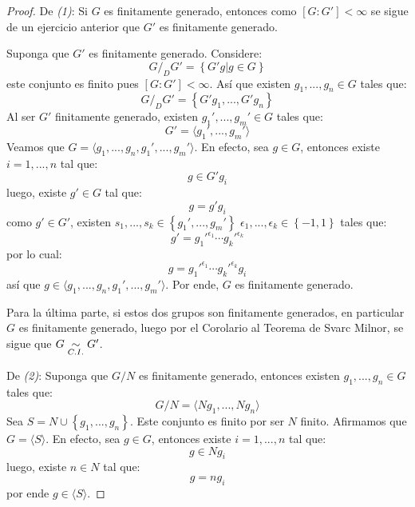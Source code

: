 \documentclass[12pt]{report}
\newcounter{it}
\theoremstyle{largebreak}
\newcommand{\gen}[1]{\ensuremath{\langle#1\rangle}}
\begin{document}
    \begin{proof}
        De \textit{(1)}: Si $G$ es finitamente generado, entonces como $[G:G']<\infty$ se sigue de un ejercicio anterior que $G'$ es finitamente generado.

        Suponga que $G'$ es finitamente generado. Considere:
        \begin{equation*}
            G/_DG'=\left\{G'g\Big|g\in G \right\}
        \end{equation*}
        este conjunto es finito pues $[G:G']<\infty$. Así que existen $g_1,...,g_n\in G$ tales que:
        \begin{equation*}
            G/_DG'=\left\{G'g_1,...,G'g_n \right\}
        \end{equation*}
        Al ser $G'$ finitamente generado, existen $g_1',...,g_m'\in G$ tales que:
        \begin{equation*}
            G'=\gen{g_1',...,g_m'}
        \end{equation*}
        Veamos que $G=\gen{g_1,...,g_n,g_1',...,g_m'}$. En efecto, sea $g\in G$, entonces existe $i=1,...,n$ tal que:
        \begin{equation*}
            g\in G'g_i
        \end{equation*}
        luego, existe $g'\in G$ tal que:
        \begin{equation*}
            g=g'g_i
        \end{equation*}
        como $g'\in G'$, existen $s_1,...,s_k\in\left\{g_1',...,g_m' \right\}$ $\epsilon_1,...,\epsilon_k\in\left\{-1,1\right\}$ tales que:
        \begin{equation*}
            g'=g_1'^{\epsilon_1}\cdots g_k'^{\epsilon_k}
        \end{equation*}
        por lo cual:
        \begin{equation*}
            g=g_1'^{\epsilon_1}\cdots g_k'^{\epsilon_k}g_i
        \end{equation*}
        así que $g\in\gen{g_1,...,g_n,g_1',...,g_m'}$. Por ende, $G$ es finitamente generado.

        Para la última parte, si estos dos grupos son finitamente generados, en particular $G$ es finitamente generado, luego por el Corolario al Teorema de Svarc Milnor, se sigue que $G\underset{C.I.}{\sim} G'$.

        De \textit{(2)}: Suponga que $G/N$ es finitamente generado, entonces existen $g_1,...,g_n\in G$ tales que:
        \begin{equation*}
            G/N=\gen{Ng_1,...,Ng_n}
        \end{equation*}
        Sea $S=N\cup\left\{g_1,...,g_n\right\}$. Este conjunto es finito por ser $N$ finito. Afirmamos que $G=\gen{S}$. En efecto, sea $g\in G$, entonces existe $i=1,...,n$ tal que:
        \begin{equation*}
            g\in Ng_i
        \end{equation*}
        luego, existe $n\in N$ tal que:
        \begin{equation*}
            g=ng_i
        \end{equation*}
        por ende $g\in\gen{S}$.


\end{proof}
\end{document}
